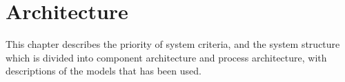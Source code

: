 \chapter{Architecture} \label{Architecture}
This chapter describes the priority of system criteria, and the system structure which is divided into component architecture and process architecture, with descriptions of the models that has been used.



